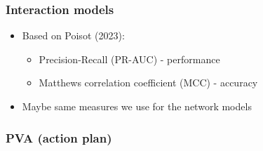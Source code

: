 \documentclass[
  letterpaper,
  DIV=11,
  numbers=noendperiod]{scrartcl}
\providecommand{\tightlist}{%
  \setlength{\itemsep}{0pt}\setlength{\parskip}{0pt}}\usepackage{longtable,booktabs,array}
\begin{document}
\subsubsection{Interaction models}\label{interaction-models}

\begin{itemize}
\tightlist
\item
  Based on Poisot (2023):

  \begin{itemize}
  \tightlist
  \item
    Precision-Recall (PR-AUC) - performance
  \item
    Matthews correlation coefficient (MCC) - accuracy
  \end{itemize}
\item
  Maybe same measures we use for the network models
\end{itemize}

\subsubsection{PVA (action plan)}\label{pva-action-plan}
\end{document}
